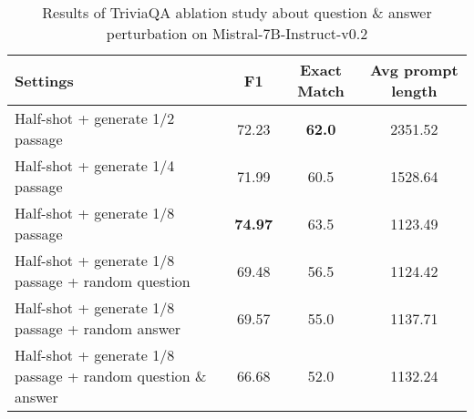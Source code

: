 \begin{table*}[h]
\renewcommand\arraystretch{1.1}
\centering
\small
\begin{tabular}{l|ccc}
\hline
 \textbf{Settings} & \textbf{F1} & \textbf{Exact Match} & \textbf{Avg prompt length}\\
\hline
Half-shot + generate 1/2 passage & 72.23 & \textbf{62.0} & 2351.52\\
Half-shot + generate 1/4 passage & 71.99 & 60.5 & 1528.64\\
Half-shot + generate 1/8 passage & \textbf{74.97} & 63.5 & 1123.49\\
Half-shot + generate 1/8 passage + random question & 69.48 & 56.5 & 1124.42\\
Half-shot + generate 1/8 passage + random answer &69.57 & 55.0 & 1137.71\\
Half-shot + generate 1/8 passage + random question \& answer & 66.68 & 52.0 & 1132.24\\
\hline
\end{tabular}
\caption{Results of TriviaQA ablation study about question \& answer perturbation on Mistral-7B-Instruct-v0.2}
\label{tab:tqa_abla_random_qa}
\end{table*}